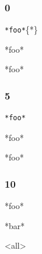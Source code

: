 \documentclass[ignorenonframetext,12pt,aspectratio=169]{beamer}
\subtitle{\mysubtitle}
\institute{\affiliation}
\date{\mydate}
\date[\mydate]{\mydate~ / \event }
\title[\mytitle\hspace{2em}\insertframenumber/
\inserttotalframenumber]{\mytitle}
\author{\myauthor}
\begin{document}
\maketitle

\begin{frame}[fragile]
\frametitle{0}
\label{0}

\texttt{*foo*}\{*\}



*foo*



*foo*

\end{frame}

\begin{frame}[fragile]
\frametitle{5}
\label{5}

\begin{lstlisting}[language={*}]
*foo*
\end{lstlisting}

*foo*

*foo*

\end{frame}

\begin{frame}[fragile]
\frametitle{10}
\label{10}

*foo*

*bar*
\end{frame}

\mode<all>
\ifdefined\makethankyou
\makethankyou
\fi
\end{document}

